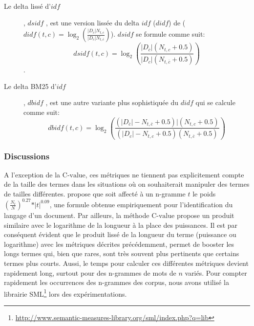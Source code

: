 \begin{description}
    \item[Le \og delta lissé d'$idf$\fg{}], $dsidf$ \citep{paltoglou2010dsidfANDdbidf}, est une version lissée du delta $idf$ ($didf$) de \citet{martineau2009didf} ($didf(t,c)=\log_2\left(\frac{\vert D_{\overline{c}} \vert N_{t,c}}{\vert D_c \vert N_{t,\overline{c}}}\right)$). $dsidf$ se formule comme suit:
    \[dsidf(t,c) = \log_2\left(\frac{\vert D_{\overline{c}} \vert (N_{t,c} + 0.5)}{\vert D_c \vert (N_{t,\overline{c}} + 0.5)}\right)\].
    \item[Le delta BM25 d'$idf$], $dbidf$ \citep{paltoglou2010dsidfANDdbidf}, est une autre variante plus sophistiquée du $didf$ qui se calcule comme suit:
    \[dbidf(t,c) = \log_2\left(\frac{( \vert D_{\overline{c}} \vert  - N_{t,\overline{c}} + 0.5) \vert (N_{t,c} + 0.5)}{(\vert D_c \vert - N_{t,c} + 0.5) (N_{t,\overline{c}} + 0.5)}\right)\]
\end{description}

\subsubsection{Discussions}

A l'exception de la $\text{C-value}$, ces métriques ne tiennent pas explicitement compte de la taille des termes dans les situations où on souhaiterait manipuler des termes de tailles différentes. \citep{brown2013ngram1100languages} propose que soit affecté à un n-gramme $t$ le poids $\left(\frac{N_t}{N}\right)^{0.27} * \vert t \vert^{0.09}$, une formule obtenue empiriquement pour l'identification du langage d'un document. Par ailleurs, la méthode $\text{C-value}$ \citep{frantzi2000CValueNCValue} propose un produit similaire avec le logarithme de la longueur à la place des puissances. Il est par conséquent évident que le produit lissé de la longueur du terme (puissance ou logarithme) avec les métriques décrites précédemment, permet de booster les longs termes qui, bien que rares, sont très souvent plus pertinents que certains termes plus courts. Aussi, le temps  pour calculer ces différentes métriques devient rapidement long, surtout pour des n-grammes de mots de $n$ variés. Pour compter rapidement les occurrences des n-grammes des corpus, nous avons utilisé la librairie SML\footnote{\url{http://www.semantic-measures-library.org/sml/index.php?q=lib}} \citep{harispe2013semlib} lors des expérimentations.


